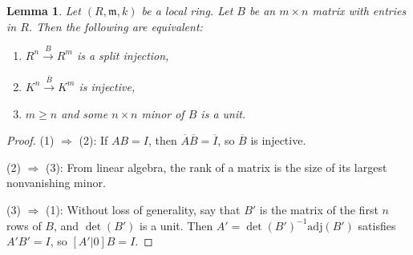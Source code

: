 \documentclass{amsart}[12pt]
\newcommand{\fm}{{\mathfrak m}}
\numberwithin{equation}{section}
\theoremstyle{plain} %
\newtheorem{lem}[equation]{Lemma}
\theoremstyle{definition}
\theoremstyle{remark}
\newcommand{\xra}[1]{\xrightarrow{#1}}
\begin{document}
\begin{lem} Let $(R,\fm,k)$ be a local ring. Let $B$ be an $m \times n$ matrix with entries in $R$. Then the following are equivalent:
\begin{enumerate}
\item $R^n \xra{B} R^m$ is a split injection,
\item $K^n \xra{\overline{B}} K^m$ is injective,
\item $m\geq n$ and some $n \times n$ minor of $B$ is a unit.
\end{enumerate}
\end{lem}
\begin{proof}
(1) $\Rightarrow$ (2): If $AB=I$, then $\overline{A}\overline{B}=\overline{I}$, so $\overline{B}$ is injective.

(2) $\Rightarrow$ (3): From linear algebra, the rank of a matrix is the size of its largest nonvanishing minor.

(3) $\Rightarrow$ (1): Without loss of generality, say that $B'$ is the matrix of the first $n$ rows of $B$, and $\det(B')$ is a unit. Then $A'=\det(B')^{-1} \mathrm{adj}(B')$ satisfies $A' B'= I$, so $[A'|0] B=I$.
\end{proof}
\end{document}
